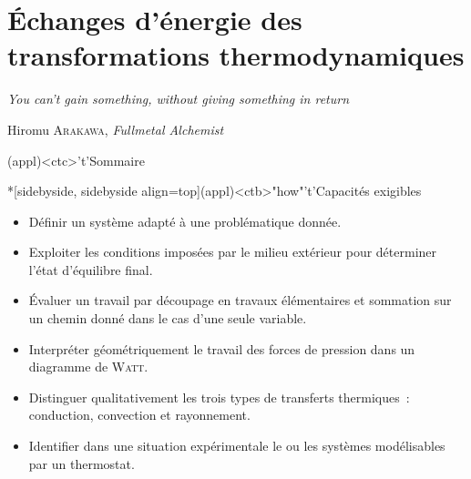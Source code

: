 \documentclass[../../main/main.tex]{subfiles}
\begin{document}
\setcounter{chapter}{0}


\chapter{Échanges d'énergie des transformations thermodynamiques}

\epigraph{\openquote\textit{You can't gain something, without giving something
		in return}\closequote}{Hiromu \textsc{Arakawa}, \textit{Fullmetal Alchemist}}

\vspace*{\fill}

\begin{tcn}(appl)<ctc>'t'{Sommaire}
	\let\item\olditem
	\vspace{-15pt}
	\minitoc
	\vspace{-25pt}
\end{tcn}

\begin{tcn}*[sidebyside, sidebyside align=top](appl)<ctb>"how"'t'{Capacités exigibles}
	\begin{itemize}[label=\rcheck]
		\item Définir un système adapté à une problématique donnée.

		\item Exploiter les conditions imposées par le milieu extérieur pour
		      déterminer l'état d'équilibre final.

		\item Évaluer un travail par découpage en travaux élémentaires et sommation
		      sur un chemin donné dans le cas d'une seule variable.
	\end{itemize}
	\tcblower
	\begin{itemize}[label=\rcheck]
		\item Interpréter géométriquement le travail des forces de pression dans un
		      diagramme de \textsc{Watt}.

		\item Distinguer qualitativement les trois types de transferts thermiques~:
		      conduction, convection et rayonnement.

		\item Identifier dans une situation expérimentale le ou les systèmes
		      modélisables par un thermostat.
	\end{itemize}
\end{tcn}
\end{document}

